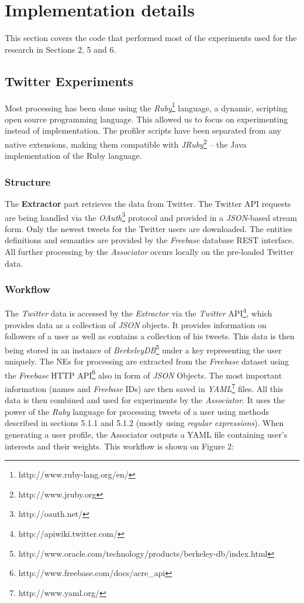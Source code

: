 \section{Implementation details}
\label{sec:implementation}

This section covers the code that performed most of the experiments used for the research in Sections 2, 5 and 6.

\subsection{Twitter Experiments}
Most processing has been done using the \textit{Ruby}\footnote{http://www.ruby-lang.org/en/}
language, a dynamic, scripting open source programming language. This allowed us
to focus on experimenting instead of implementation. The profiler scripts have been
separated from any native extensions, making them compatible with \textit{JRuby}\footnote{http://www.jruby.org} -- the Java implementation
of the Ruby language.

\subsubsection{Structure}
The \textbf{Extractor} part retrieves the data from Twitter. The Twitter API requests are being handled via the \textit{OAuth}\footnote{http://oauth.net/} protocol and provided in a
\textit{JSON}-based stream form. Only the newest tweets for the Twitter
users are downloaded. The entities definitions and semantics are provided by
the \textit{Freebase} database REST interface. All further processing by the \textit{Associator}
occurs locally on the pre-loaded Twitter data.

\subsubsection{Workflow}

The \textit{Twitter} data is accessed by the \textit{Extractor} via the \textit{Twitter}
API\footnote{http://apiwiki.twitter.com/}, which provides data as a collection of \textit{JSON} objects. It provides
information on followers of a user as well as contains a collection of his tweets. This data is then being
stored in an instance of \textit{BerkeleyDB}\footnote{http://www.oracle.com/technology/products/berkeley-db/index.html}
under a key representing the user uniquely. The NEs for processing are extracted from the \textit{Freebase}
dataset using the \textit{Freebase} HTTP API\footnote{http://www.freebase.com/docs/acre\_api} also in
form of \textit{JSON} Objects. The most important information (names and \textit{Freebase} IDs) are then
saved in \textit{YAML}\footnote{http://www.yaml.org/} files. All this data is then combined and used
for experiments by the \textit{Associator}. It uses the power of the \textit{Ruby} language for processing tweets
of a user using methods described in sections 5.1.1 and 5.1.2 (mostly using \textit{regular expressions}).
When generating a user profile, the Associator outputs a YAML file containing user's interests and
their weights. This workflow is shown on Figure 2:

